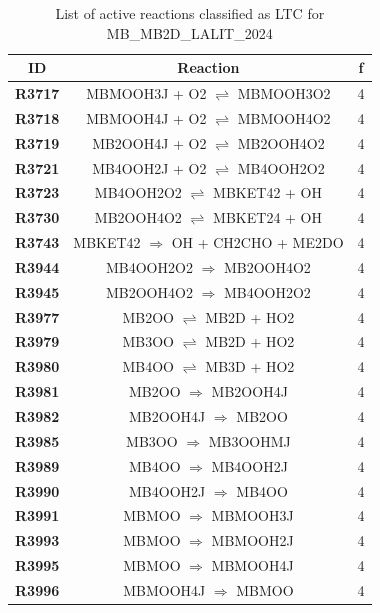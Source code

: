 \begin{table}[!ht]
\centering
\caption{List of active reactions classified as LTC for MB_MB2D_LALIT_2024}
\label{table:MB_MB2D_LALIT_2024_LTC}
\begin{tabular}{ccc}
\hline
\textbf{ID} & \textbf{Reaction} & \textbf{f} \\
\hline
\textbf{R3717} & MBMOOH3J + O2 $\rightleftharpoons$ MBMOOH3O2 & 4 \\
\textbf{R3718} & MBMOOH4J + O2 $\rightleftharpoons$ MBMOOH4O2 & 4 \\
\textbf{R3719} & MB2OOH4J + O2 $\rightleftharpoons$ MB2OOH4O2 & 4 \\
\textbf{R3721} & MB4OOH2J + O2 $\rightleftharpoons$ MB4OOH2O2 & 4 \\
\textbf{R3723} & MB4OOH2O2 $\rightleftharpoons$ MBKET42 + OH & 4 \\
\textbf{R3730} & MB2OOH4O2 $\rightleftharpoons$ MBKET24 + OH & 4 \\
\textbf{R3743} & MBKET42 $\Rightarrow$ OH + CH2CHO + ME2DO & 4 \\
\textbf{R3944} & MB4OOH2O2 $\Rightarrow$ MB2OOH4O2 & 4 \\
\textbf{R3945} & MB2OOH4O2 $\Rightarrow$ MB4OOH2O2 & 4 \\
\textbf{R3977} & MB2OO $\rightleftharpoons$ MB2D + HO2 & 4 \\
\textbf{R3979} & MB3OO $\rightleftharpoons$ MB2D + HO2 & 4 \\
\textbf{R3980} & MB4OO $\rightleftharpoons$ MB3D + HO2 & 4 \\
\textbf{R3981} & MB2OO $\Rightarrow$ MB2OOH4J & 4 \\
\textbf{R3982} & MB2OOH4J $\Rightarrow$ MB2OO & 4 \\
\textbf{R3985} & MB3OO $\Rightarrow$ MB3OOHMJ & 4 \\
\textbf{R3989} & MB4OO $\Rightarrow$ MB4OOH2J & 4 \\
\textbf{R3990} & MB4OOH2J $\Rightarrow$ MB4OO & 4 \\
\textbf{R3991} & MBMOO $\Rightarrow$ MBMOOH3J & 4 \\
\textbf{R3993} & MBMOO $\Rightarrow$ MBMOOH2J & 4 \\
\textbf{R3995} & MBMOO $\Rightarrow$ MBMOOH4J & 4 \\
\textbf{R3996} & MBMOOH4J $\Rightarrow$ MBMOO & 4 \\
\hline
\end{tabular}
\end{table}